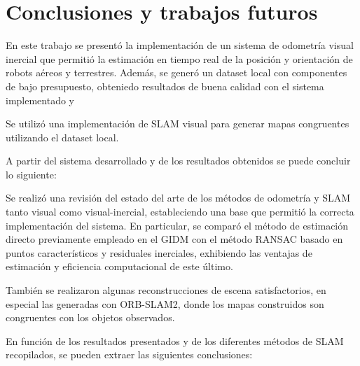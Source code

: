 \chapter{Conclusiones y trabajos futuros}
\label{capitulo7}

En este trabajo se presentó la implementación de un sistema de odometría visual inercial que permitió la estimación en tiempo real de la posición y orientación de robots aéreos y terrestres. Además, se generó un dataset local con componentes de bajo presupuesto, obteniedo resultados de buena calidad con el sistema implementado y

Se utilizó una implementación de SLAM visual para generar mapas  congruentes utilizando el dataset local.

A partir del sistema desarrollado y de los resultados obtenidos se puede concluir lo siguiente:


Se realizó una revisión del estado del arte de los métodos de odometría y SLAM tanto visual como visual-inercial, estableciendo una base que permitió la correcta implementación del sistema. En particular, se comparó el método de estimación directo previamente empleado en el GIDM con el método RANSAC basado en puntos característicos y residuales inerciales, exhibiendo las ventajas de estimación y eficiencia computacional de este último.

También se realizaron algunas reconstrucciones de escena satisfactorios, en especial las generadas con ORB-SLAM2, donde los mapas construidos son congruentes con los objetos observados. 


En función de los resultados presentados y de los diferentes métodos de SLAM recopilados, se pueden extraer las siguientes conclusiones:




